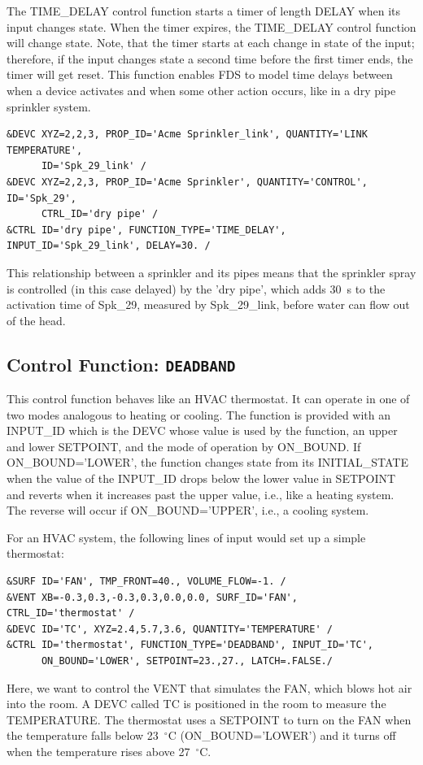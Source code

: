 \documentclass[11pt]{book}
\begin{document}
\label{info:TIME_DELAY}

The {\ct TIME\_DELAY} control function starts a timer of length {\ct DELAY} when its input changes state. When the timer expires, the {\ct TIME\_DELAY} control function will change state. Note, that the timer starts at each change in state of the input; therefore, if the input changes state a second time before the first timer ends, the timer will get reset. This function enables FDS to model time delays between when a device activates and when some other action occurs, like in a dry pipe sprinkler system.
\begin{lstlisting}
&DEVC XYZ=2,2,3, PROP_ID='Acme Sprinkler_link', QUANTITY='LINK TEMPERATURE',
      ID='Spk_29_link' /
&DEVC XYZ=2,2,3, PROP_ID='Acme Sprinkler', QUANTITY='CONTROL', ID='Spk_29',
      CTRL_ID='dry pipe' /
&CTRL ID='dry pipe', FUNCTION_TYPE='TIME_DELAY', INPUT_ID='Spk_29_link', DELAY=30. /
\end{lstlisting}
This relationship between a sprinkler and its pipes means that the sprinkler spray is controlled (in this case delayed) by the {\ct 'dry pipe'}, which adds 30~s to the activation time of {\ct Spk\_29}, measured by  {\ct Spk\_29\_link}, before water can flow out of the head.


\subsection{Control Function: \texorpdfstring{{\tt DEADBAND}}{DEADBAND}}
\label{info:DEADBAND}

This control function behaves like an HVAC thermostat.  It can operate in one of two modes analogous to heating or cooling. The function is provided with an {\ct INPUT\_ID} which is the {\ct DEVC} whose value is used by the function, an upper and lower {\ct SETPOINT}, and the mode of operation by {\ct ON\_BOUND}.  If  {\ct ON\_BOUND='LOWER'}, the function changes state from its {\ct INITIAL\_STATE} when the value of the {\ct INPUT\_ID} drops below the lower value in {\ct SETPOINT} and reverts when it increases past the upper value, i.e., like a heating system. The reverse will occur if {\ct ON\_BOUND='UPPER'}, i.e., a cooling system.

For an HVAC system, the following lines of input would set up a simple thermostat:
\begin{lstlisting}
&SURF ID='FAN', TMP_FRONT=40., VOLUME_FLOW=-1. /
&VENT XB=-0.3,0.3,-0.3,0.3,0.0,0.0, SURF_ID='FAN', CTRL_ID='thermostat' /
&DEVC ID='TC', XYZ=2.4,5.7,3.6, QUANTITY='TEMPERATURE' /
&CTRL ID='thermostat', FUNCTION_TYPE='DEADBAND', INPUT_ID='TC',
      ON_BOUND='LOWER', SETPOINT=23.,27., LATCH=.FALSE./
\end{lstlisting}
Here, we want to control the {\ct VENT} that simulates the {\ct FAN}, which blows hot air into the room. A {\ct DEVC} called {\ct TC} is positioned in the room to measure the {\ct TEMPERATURE}. The {\ct thermostat} uses a {\ct SETPOINT} to turn on the {\ct FAN} when the temperature falls below 23~$^\circ$C ({\ct ON\_BOUND='LOWER'}) and it turns off when the temperature rises above 27~$^\circ$C.
\end{document}
